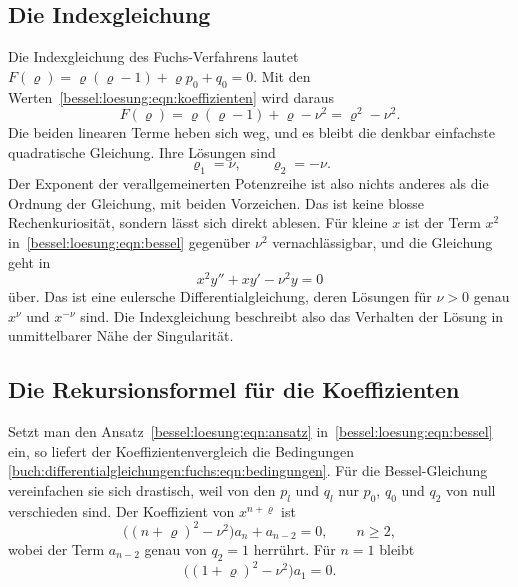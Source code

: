 %
%
\subsection{Die Indexgleichung
\label{bessel:loesung:subsection:index}}
Die Indexgleichung des Fuchs-Verfahrens lautet $F(\varrho) = \varrho(\varrho-1) + \varrho p_0 + q_0 = 0$.
Mit den Werten~\eqref{bessel:loesung:eqn:koeffizienten} wird daraus
\begin{equation}
F(\varrho)
=
\varrho(\varrho-1) + \varrho - \nu^2
=
\varrho^2 - \nu^2.
\label{bessel:loesung:eqn:index}
\end{equation}
Die beiden linearen Terme heben sich weg, und es bleibt die denkbar einfachste quadratische Gleichung.
Ihre Lösungen sind
\begin{equation}
\varrho_1 = \nu,
\qquad
\varrho_2 = -\nu.
\label{bessel:loesung:eqn:varrho}
\end{equation}
Der Exponent der verallgemeinerten Potenzreihe ist also nichts anderes als die Ordnung der Gleichung, mit beiden Vorzeichen.
Das ist keine blosse Rechenkuriosität, sondern lässt sich direkt ablesen.
Für kleine $x$ ist der Term $x^2$ in~\eqref{bessel:loesung:eqn:bessel}
gegenüber $\nu^2$ vernachlässigbar, und die Gleichung geht in
\[
x^2y'' + xy' - \nu^2 y = 0
\]
über.
Das ist eine eulersche Differentialgleichung, deren Lösungen für $\nu>0$ genau $x^{\nu}$ und $x^{-\nu}$ sind.
Die Indexgleichung beschreibt also das Verhalten der Lösung in unmittelbarer Nähe der Singularität.
 
%
%
\subsection{Die Rekursionsformel für die Koeffizienten
\label{bessel:loesung:subsection:rekursion}}
Setzt man den Ansatz~\eqref{bessel:loesung:eqn:ansatz} in~\eqref{bessel:loesung:eqn:bessel} ein, so liefert der Koeffizientenvergleich die Bedingungen \eqref{buch:differentialgleichungen:fuchs:eqn:bedingungen}.
Für die Bessel-Gleichung vereinfachen sie sich drastisch, weil von den $p_l$ und $q_l$ nur $p_0$, $q_0$ und $q_2$ von null verschieden sind.
Der Koeffizient von $x^{n+\varrho}$ ist
\begin{equation}
\bigl((n+\varrho)^2-\nu^2\bigr)a_n + a_{n-2} = 0,
\qquad n \ge 2,
\label{bessel:loesung:eqn:rekursion}
\end{equation}
wobei der Term $a_{n-2}$ genau von $q_2=1$ herrührt.
Für $n=1$ bleibt
\begin{equation}
\bigl((1+\varrho)^2-\nu^2\bigr)a_1 = 0.
\label{bessel:loesung:eqn:a1}
\end{equation}
 
